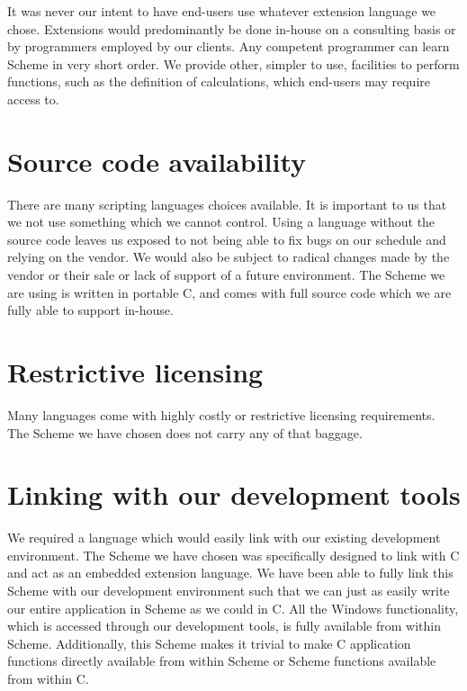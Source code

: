 It was never our intent to have end-users use whatever extension
language we chose.  Extensions would predominantly be done in-house on
a consulting basis or by programmers employed by our clients.  Any
competent programmer can learn Scheme in very short order.  We provide
other, simpler to use, facilities to perform functions, such as the
definition of calculations, which end-users may require access to.


\section{Source code availability}

There are many scripting languages choices available.  It is important
to us that we not use something which we cannot control.  Using a
language without the source code leaves us exposed to not being able
to fix bugs on our schedule and relying on the vendor.  We would also
be subject to radical changes made by the vendor or their sale or lack
of support of a future environment.  The Scheme we are using is
written in portable C, and comes with full source code which we are
fully able to support in-house.

\section{Restrictive licensing}

Many languages come with highly costly or restrictive licensing
requirements.  The Scheme we have chosen does not carry any of
that baggage.


\section{Linking with our development tools}

We required a language which would easily link with our existing
development environment.  The Scheme we have chosen was specifically
designed to link with C and act as an embedded extension language.  We
have been able to fully link this Scheme with our development
environment such that we can just as easily write our entire
application in Scheme as we could in C.  All the Windows
functionality, which is accessed through our development tools, is
fully available from within Scheme.  Additionally, this Scheme makes
it trivial to make C application functions directly available from
within Scheme or Scheme functions available from within C.

\bye
